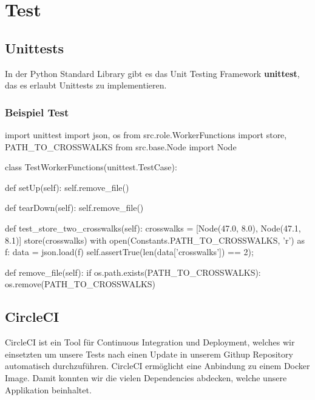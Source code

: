 \section{Test}
\subsection{Unittests}
In der Python Standard Library gibt es das Unit Testing Framework \textbf{unittest}, das es erlaubt Unittests zu implementieren.

\subsubsection{Beispiel Test}
\begin{python}
import unittest
import json, os
from src.role.WorkerFunctions import store, PATH_TO_CROSSWALKS
from src.base.Node import Node

class TestWorkerFunctions(unittest.TestCase):

    def setUp(self):
        self.remove_file()

    def tearDown(self):
        self.remove_file()
        
    def test_store_two_crosswalks(self):
        crosswalks = [Node(47.0, 8.0), Node(47.1, 8.1)]
        store(crosswalks)
        with open(Constants.PATH_TO_CROSSWALKS, 'r') as f:
            data = json.load(f)
        self.assertTrue(len(data['crosswalks']) == 2);
        
    def remove_file(self):
        if os.path.exists(PATH_TO_CROSSWALKS):
            os.remove(PATH_TO_CROSSWALKS) 
\end{python}
\subsection{CircleCI}
\Gls{CircleCI}\cite{circleci} ist ein Tool für Continuous Integration und Deployment, welches wir einsetzten um unsere Tests nach einen Update in unserem Githup Repository automatisch durchzuführen. CircleCI ermöglicht eine Anbindung zu einem Docker Image. Damit konnten wir die vielen Dependencies abdecken, welche unsere Applikation beinhaltet.
